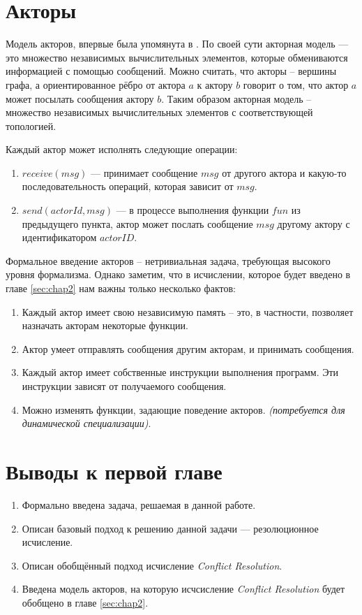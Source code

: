 \section{Акторы}

  Модель акторов, впервые была упомянута в \cite{Hewitt:1973:UMA:1624775.1624804}. По своей сути акторная модель --- это множество независимых вычислительных элементов, которые обмениваются информацией с помощью сообщений. Можно считать, что акторы -- вершины графа, а ориентированное рёбро от актора $a$ к актору $b$ говорит о том, что актор $a$ может посылать сообщения актору $b$. Таким образом акторная модель -- множество независимых вычислительных элементов с соответствующей топологией. 
  
Каждый актор может исполнять следующие операции:

\begin{enumerate}
  	\item $receive(msg)$ --- принимает сообщение $msg$ от другого актора и какую-то последовательность операций, которая зависит от $msg$.
    \item $send(actorId, msg)$ --- в процессе выполнения функции $fun$ из предыдущего пункта, актор может послать сообщение $msg$ другому актору с идентификатором $actorID$.
\end{enumerate}

Формальное введение акторов -- нетривиальная задача, требующая высокого уровня формализма. Однако заметим, что в исчислении, которое будет введено в главе \ref{sec:chap2} нам важны только несколько фактов:
\begin{enumerate}
	\item Каждый актор имеет свою независимую память -- это, в частности, позволяет назначать акторам некоторые функции.
    \item Актор умеет отправлять сообщения другим акторам, и принимать сообщения.
    \item Каждый актор имеет собственные инструкции выполнения программ. Эти инструкции зависят от получаемого сообщения.
    \item Можно изменять функции, задающие поведение акторов. \emph{(потребуется для динамической специализации)}.
\end{enumerate}

\section{Выводы к первой главе}
\begin{enumerate}
	\item Формально введена задача, решаемая в данной работе.
    \item Описан базовый подход к решению данной задачи --- резолюционное исчисление.
    \item Описан обобщённый подход исчисление \emph{Conflict Resolution}.
    \item Введена модель акторов, на которую исчсисление \emph{Conflict Resolution} будет обобщено в главе \ref{sec:chap2}.
\end{enumerate}

